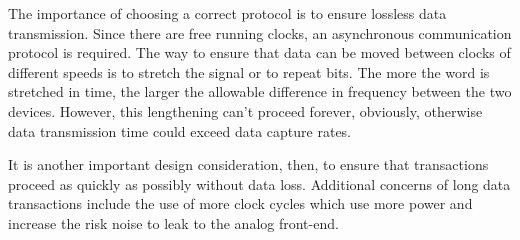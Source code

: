 The importance of choosing a correct protocol is to ensure lossless data transmission.
Since there are free running clocks, an asynchronous communication protocol is required.
The way to ensure that data can be moved between clocks of different speeds is to stretch the signal or to repeat bits.
The more the word is stretched in time, the larger the allowable difference in frequency between the two devices.
However, this lengthening can't proceed forever, obviously, otherwise data transmission time could exceed data capture rates.

It is another important design consideration, then, to ensure that transactions proceed as quickly as possibly without data loss.
Additional concerns of long data transactions include the use of more clock cycles which use more power and increase the risk noise to leak to the analog front-end.



